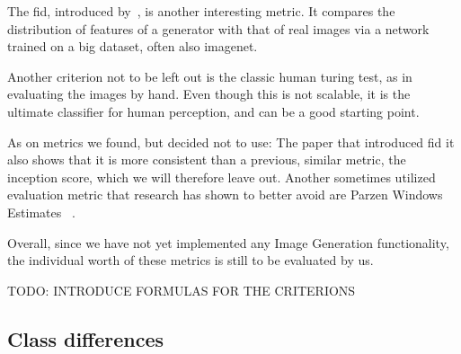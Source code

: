 The \ac{fid}, introduced by~\cite{fid}, is another interesting metric.
It compares the distribution of features of a generator with that of real images via a network trained on a big
dataset, often also imagenet.

Another criterion not to be left out is the classic human turing test, as in evaluating the images by hand.
Even though this is not scalable, it is the ultimate classifier for human perception, and can be a good starting
point.

As on metrics we found, but decided not to use: The paper that introduced \ac{fid} it also shows that it is more
consistent than a previous, similar metric, the inception score, which we will therefore leave out.
Another sometimes utilized evaluation metric that research has shown to better avoid are Parzen Windows Estimates~
\cite{note_on_eval}.

Overall, since we have not yet implemented any Image Generation functionality, the individual worth of these metrics
is still to be evaluated by us.

TODO: INTRODUCE FORMULAS FOR THE CRITERIONS

\subsection{Class differences}

